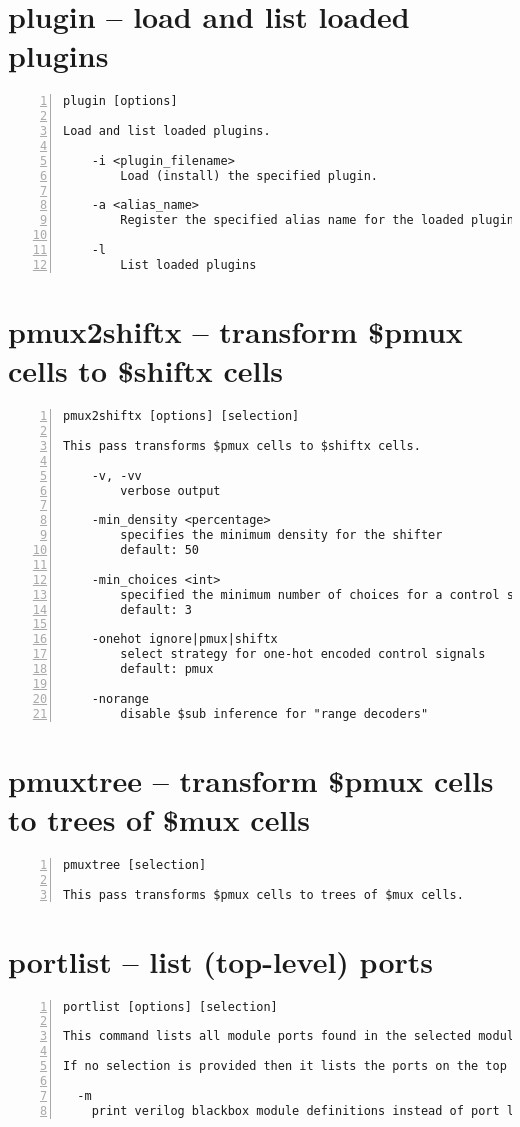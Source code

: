\section{plugin -- load and list loaded plugins}
\label{cmd:plugin}
\begin{lstlisting}[numbers=left,frame=single]
    plugin [options]

Load and list loaded plugins.

    -i <plugin_filename>
        Load (install) the specified plugin.

    -a <alias_name>
        Register the specified alias name for the loaded plugin

    -l
        List loaded plugins
\end{lstlisting}

\section{pmux2shiftx -- transform \$pmux cells to \$shiftx cells}
\label{cmd:pmux2shiftx}
\begin{lstlisting}[numbers=left,frame=single]
    pmux2shiftx [options] [selection]

This pass transforms $pmux cells to $shiftx cells.

    -v, -vv
        verbose output

    -min_density <percentage>
        specifies the minimum density for the shifter
        default: 50

    -min_choices <int>
        specified the minimum number of choices for a control signal
        default: 3

    -onehot ignore|pmux|shiftx
        select strategy for one-hot encoded control signals
        default: pmux

    -norange
        disable $sub inference for "range decoders"
\end{lstlisting}

\section{pmuxtree -- transform \$pmux cells to trees of \$mux cells}
\label{cmd:pmuxtree}
\begin{lstlisting}[numbers=left,frame=single]
    pmuxtree [selection]

This pass transforms $pmux cells to trees of $mux cells.
\end{lstlisting}

\section{portlist -- list (top-level) ports}
\label{cmd:portlist}
\begin{lstlisting}[numbers=left,frame=single]
    portlist [options] [selection]

This command lists all module ports found in the selected modules.

If no selection is provided then it lists the ports on the top module.

  -m
    print verilog blackbox module definitions instead of port lists
\end{lstlisting}

